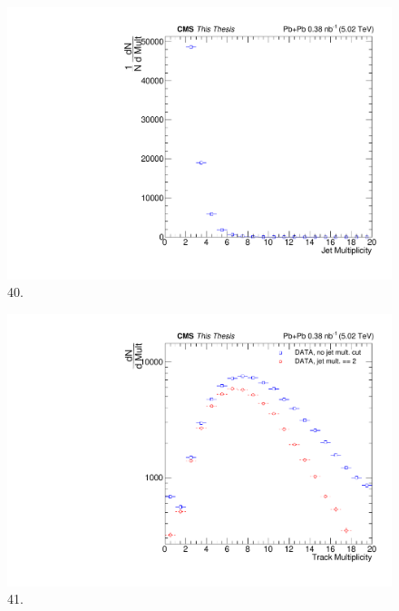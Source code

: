 \begin{figure}[h!]
\begin{centering}
\includegraphics[width=5in]{Chapter6/importfigs/40_thesis.pdf}
\par\end{centering}
\caption{40. \label{fig:40}}
\end{figure}

\begin{figure}[h!]
\begin{centering}
\includegraphics[width=5in]{Chapter6/importfigs/41_42_thesis.pdf}
\par\end{centering}
\caption{41. \label{fig:41_42}}
\end{figure}

